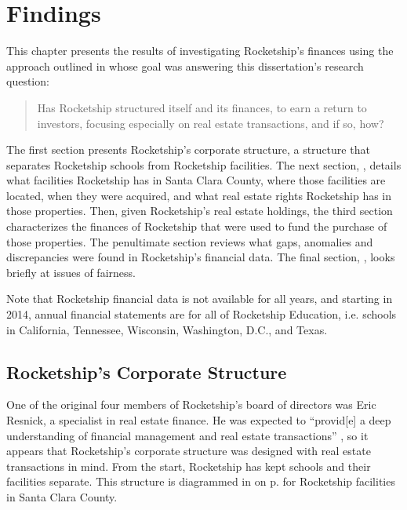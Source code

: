 
\chapter{Findings}%
\label{ch:findings}

This chapter presents the results of investigating Rocketship's finances using the approach outlined in  whose goal was answering this dissertation's research question:
\begin{quote}\noindent%
Has Rocketship structured itself and its finances, to earn a return to investors, focusing especially on real estate transactions, and if so, how?
\end{quote}

The first section presents Rocketship's corporate structure, a structure that separates Rocketship schools from Rocketship facilities. The next section, , details what facilities Rocketship has in Santa Clara County, where those facilities are located, when they were acquired, and what real estate rights Rocketship has in those properties. Then, given Rocketship's real estate holdings, the third section characterizes the finances of Rocketship that were used to fund the purchase of those properties. The penultimate section reviews what gaps, anomalies and discrepancies were found in Rocketship's financial data. The final section, , looks briefly at issues of fairness.

Note that Rocketship financial data is not available for all years, and starting in 2014, annual financial statements are for all of Rocketship Education, i.e. schools in California, Tennessee, Wisconsin, Washington, D.C., and Texas.

\section{Rocketship's Corporate Structure}%
\label{sec:RSED-corporate-structure}\indent%

One of the original four members of Rocketship's board of directors was Eric Resnick, a specialist in real estate finance. He was expected to ``provid[e] a deep understanding of financial management and real estate transactions'' \parencite[13]{Danner2006}, so it appears that Rocketship's corporate structure was designed with real estate transactions in mind. From the start, Rocketship has kept schools and their facilities separate. This structure is diagrammed in  on p.\pageref{fig:corporate-structure} for Rocketship facilities in Santa Clara County.

